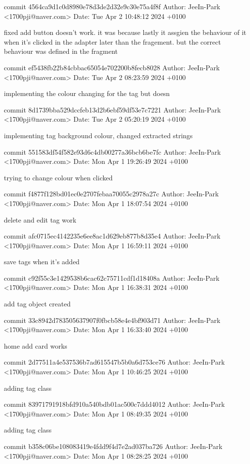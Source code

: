 commit 4564ca9d1c0d8980e78d3de2d32e9c30e75a4f8f
Author: JeeIn-Park <1700pji@naver.com>
Date:   Tue Apr 2 10:48:12 2024 +0100

    fixed add button doesn't work. it was because lastly it assgien the behaviour of it when it's clicked in the adapter later than the fragement. but the correct behaviour was defined in the fragment

commit ef5438fb22b84cbbac65054e702200b8fecb8028
Author: JeeIn-Park <1700pji@naver.com>
Date:   Tue Apr 2 08:23:59 2024 +0100

    implementing the colour changing for the tag but doesn

commit 8d1739bba529dccfeb13d2b6ebf59df53e7c7221
Author: JeeIn-Park <1700pji@naver.com>
Date:   Tue Apr 2 05:20:19 2024 +0100

    implementing tag background colour, changed extracted strings

commit 551583df54f582e93d6c4db00277a36bcb6be7fc
Author: JeeIn-Park <1700pji@naver.com>
Date:   Mon Apr 1 19:26:49 2024 +0100

    trying to change colour when clicked

commit f4877f128bd01ec0e2707febaa70055c2978a27c
Author: JeeIn-Park <1700pji@naver.com>
Date:   Mon Apr 1 18:07:54 2024 +0100

    delete and edit tag work

commit afc0715ec4142235e6ee8ac1d629eb877b8d35e4
Author: JeeIn-Park <1700pji@naver.com>
Date:   Mon Apr 1 16:59:11 2024 +0100

    save tags when it's added

commit c92f55c3e1429538b6cac62c75711cdf1d18408a
Author: JeeIn-Park <1700pji@naver.com>
Date:   Mon Apr 1 16:38:31 2024 +0100

    add tag object created

commit 33c8942d783505637907f0fbcb58e4e4bf903d71
Author: JeeIn-Park <1700pji@naver.com>
Date:   Mon Apr 1 16:33:40 2024 +0100

    home add card works

commit 2d77511a4e537536b7ad615547b5b0a6d753ce76
Author: JeeIn-Park <1700pji@naver.com>
Date:   Mon Apr 1 10:46:25 2024 +0100

    adding tag class

commit 83971791918bfd910a540bdb01ac500c7ddd4012
Author: JeeIn-Park <1700pji@naver.com>
Date:   Mon Apr 1 08:49:35 2024 +0100

    adding tag class

commit b358c06be108083419e4fdd9f4d7e2ad037ba726
Author: JeeIn-Park <1700pji@naver.com>
Date:   Mon Apr 1 08:28:25 2024 +0100

